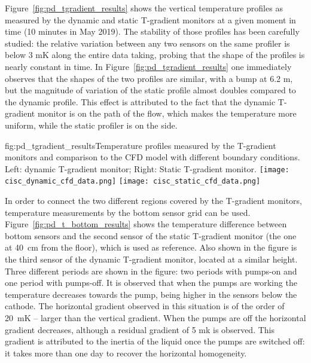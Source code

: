 Figure~\ref{fig:pd_tgradient_results} shows the vertical temperature profiles as measured by the dynamic and static T-gradient monitors at a given moment in time (10 minutes in May 2019). The stability of those profiles has been carefully studied: the relative variation between any two sensors on the same profiler is below 3 mK along the entire data taking, probing that the shape of the profiles is nearly constant in time. In Figure~\ref{fig:pd_tgradient_results} one immediately observes that the shapes of the two profiles are similar, with a bump at 6.2 m, but the magnitude of %
variation of the static profile almost doubles %
compared to the dynamic profile. This effect is attributed to the fact that the dynamic T-gradient monitor is on the path of the \lar flow, which makes the temperature more uniform, while the static profiler is on the side.  

\begin{dunefigure}{fig:pd_tgradient_results}{Temperature profiles measured by the T-gradient monitors and comparison to the CFD model with different boundary conditions. Left: dynamic T-gradient monitor; Right: Static T-gradient monitor.}
  \texttt{[image: cisc\_dynamic\_cfd\_data.png]}%
  \texttt{[image: cisc\_static\_cfd\_data.png]}%
\end{dunefigure}

In order to connect the two different %
regions covered by the T-gradient monitors, temperature measurements by the bottom sensor grid can be used. Figure~\ref{fig:pd_t_bottom_results} shows the temperature difference between bottom sensors and the second sensor of the static T-gradient monitor (the one at 40~cm from the floor), which is used as reference. %
Also shown in the figure is the third sensor of the dynamic T-gradient monitor, located at a similar height. Three different periods are shown in the figure: two periods with pumps-on and one period with pumps-off. It is observed that when the pumps are working the temperature decreases towards the  pump, being  higher in the sensors below the cathode. The horizontal gradient observed in this situation is of the order of 20~mK -- larger than the vertical gradient. When the pumps are off the horizontal gradient decreases, although a residual gradient of 5 mk is observed. This gradient is attributed to the inertia of the liquid once the pumps are switched off: it takes more than one day to recover the horizontal homogeneity.    

